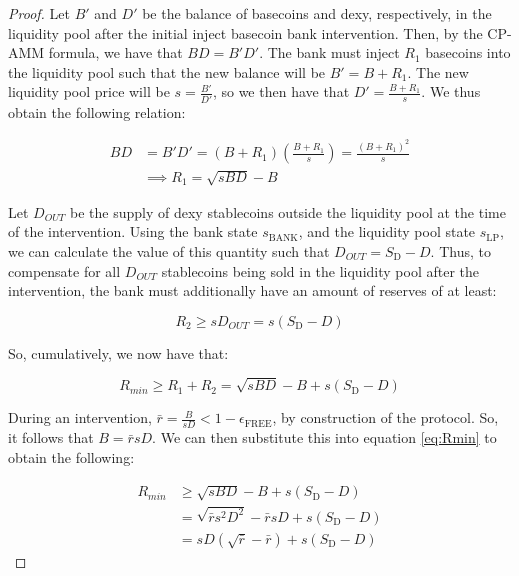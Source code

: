 \documentclass{ifcolog}
\newcommand{\Sd}{S_{\mathrm{D}}}
\newcommand{\rr}{\bar{r}}
\newcommand{\sbank}{s_{\textrm{BANK}}}
\newcommand{\slp}{s_{\mathrm{LP}}}
\newcommand{\epsilonfree}{\epsilon_{\textrm{FREE}}}
\begin{document}
\begin{proof}
  Let $B'$ and $D'$ be the balance of basecoins and dexy, respectively, in the liquidity pool after the initial 
  inject basecoin bank intervention. Then, by the CP-AMM formula, we have that $BD = B'D'$. The bank must inject $R_1$ basecoins
  into the liquidity pool such that the new balance will be $B' = B + R_1$. The new liquidity pool price will be $s = \frac{B'}{D'}$, 
  so we then have that $D' = \frac{B + R_1}{s}$. We thus obtain the following relation:
  
  \begin{align}
    BD &= B'D' = (B+R_1)\left(\frac{B+R_1}{s}\right) = \frac{(B+R_1)^2}{s} \\
       &\implies R_1 = \sqrt{sBD} - B
  \end{align}

  Let $D_{OUT}$ be the supply of dexy stablecoins outside the liquidity pool at the time of the intervention.
  Using the bank state $\sbank$, and the liquidity pool state $\slp$, we can calculate the value of this 
  quantity such that $D_{OUT} = \Sd - D$. Thus, to compensate for all $D_{OUT}$ stablecoins being sold
  in the liquidity pool after the intervention, the bank must additionally have an amount of reserves of at least:

  \begin{equation}
    R_2 \ge s D_{OUT} = s(\Sd - D)
  \end{equation}

  So, cumulatively, we now have that: 

  \begin{equation}
    \label{eq:Rmin}
    R_{min} \ge R_1 + R_2 = \sqrt{sBD} - B + s\left(\Sd - D\right)
  \end{equation}

  During an intervention, $\rr = \frac{B}{sD} < 1 - \epsilonfree$, by construction of the protocol.
  So, it follows that $B = \rr sD$. We can then substitute this into equation \ref{eq:Rmin} to obtain the following:

  \begin{align}
    R_{min} &\ge \sqrt{sBD} - B + s\left(\Sd - D\right) \\
            &= \sqrt{\rr s^2 D^2} - \rr sD + s\left(\Sd - D\right) \\
            &= sD \left( \sqrt{\rr} - \rr \right) + s\left(\Sd - D\right)
  \end{align}

\end{proof}
\end{document}
